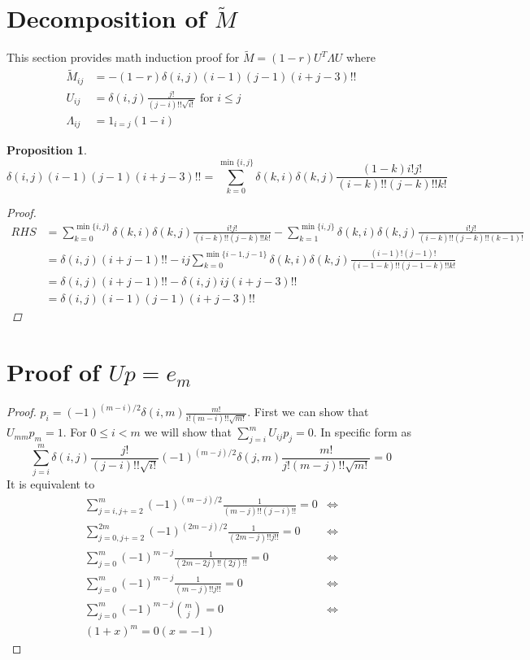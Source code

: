 \documentclass{article}
\newtheorem{proposition}{Proposition}
\begin{document}
\section{Decomposition of $\widetilde{M}$}
This section provides math induction proof for
$\widetilde{M}= (1-r) U^T \Lambda U$ where
\begin{align}
\widetilde{M}_{ij} & = -(1-r)\delta(i, j) (i-1)(j-1) (i+j-3)!! \\
U_{ij} & = \delta(i, j) \frac{j!}{(j-i)!!\sqrt{i!}} \textrm{ for } i\leq j \\
\Lambda_{ij} & = 1_{i = j} (1-i)
\end{align}
\begin{proposition}\label{prop:UUM}
\begin{equation}
\delta(i, j)(i-1)(j-1)(i+j-3)!! = \sum_{k=0}^{\min\{i, j\}}
\delta(k, i) \delta(k, j) \frac{(1-k)i!j!}{(i-k)!!(j-k)!!k!}
\end{equation}
\begin{proof}
\begin{align*}
RHS & = \sum_{k=0}^{\min\{i, j\}}
\delta(k, i) \delta(k, j) \frac{i!j!}{(i-k)!!(j-k)!!k!}
- \sum_{k=1}^{\min\{i, j\}}
\delta(k, i) \delta(k, j) \frac{i!j!}{(i-k)!!(j-k)!!(k-1)!} \\
& = \delta(i, j)(i+j-1)!! - ij\sum_{k=0}^{\min\{i-1, j-1\}}
\delta(k, i) \delta(k, j) \frac{(i-1)!(j-1)!}{(i-1-k)!!(j-1-k)!!k!} \\
& = \delta(i, j)(i+j-1)!! - \delta(i, j)ij(i+j-3)!! \\
& = \delta(i, j)(i-1)(j-1)(i+j-3)!!
\end{align*}
\end{proof}
\end{proposition}
\section{Proof of $Up=e_m$}
\begin{proof}
$p_i = (-1)^{(m-i)/2}\delta(i, m) \frac{m!}{i!(m-i)!! \sqrt{m!}} $.
First we can show that $U_{mm} p_m = 1 $. For $ 0\leq i < m $ we
will show that $ \sum_{j=i}^m U_{ij} p_j = 0 $. In specific form as
\begin{equation}
\sum_{j=i}^m \delta(i, j) \frac{j!}{(j-i)!!\sqrt{i!}} (-1)^{(m-j)/2}\delta(j, m) \frac{m!}{j!(m-j)!! \sqrt{m!}} = 0
\end{equation}
It is equivalent to
\begin{align*}
\sum_{j=i, j+=2}^m (-1)^{(m-j)/2} \frac{1}{(m-j)!!(j-i)!!}  = 0 & \iff \\ 
\sum_{j=0, j+=2}^{2m} (-1)^{(2m-j)/2} \frac{1}{(2m-j)!! j!!} = 0 & \iff \\
\sum_{j=0}^{m} (-1)^{m-j} \frac{1}{(2m-2j)!! (2j)!!} = 0 & \iff \\
\sum_{j=0}^{m} (-1)^{m-j} \frac{1}{(m-j)!! j!!} = 0 & \iff \\
\sum_{j=0}^{m} (-1)^{m-j} \binom{m}{j} = 0 & \iff \\
(1+x)^m = 0 (x=-1)
\end{align*}
\end{proof}
\end{document}
